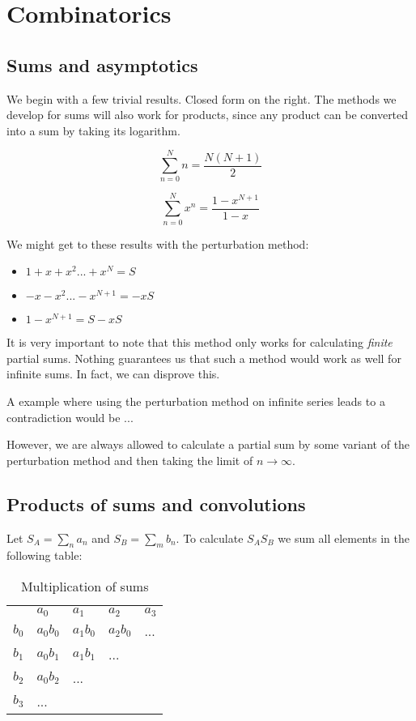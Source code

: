 \section{Combinatorics}

\subsection{Sums and asymptotics}

We begin with a few trivial results. Closed form on the right. The methods we develop for sums will also work for products, since any product can be converted into a sum by taking its logarithm.

$$ \sum_{n=0}^N n = \frac{N(N+1)}{2} $$

$$ \sum_{n=0}^N x^n = \frac{1-x^{N+1}}{1-x} $$

We might get to these results with the perturbation method:

\begin{itemize}
    \item $ 1 + x + x^2 ... + x^N = S $
    \item $ -x -x^2 ... -x^{N+1} = -xS $
    \item $ 1 - x^{N+1} = S -xS $
\end{itemize}

It is very important to note that this method only works for calculating \textit{finite} partial sums. Nothing guarantees us that such a method would work as well for infinite sums. In fact, we can disprove this.

\begin{theorem}
    A example where using the perturbation method on infinite series leads to a contradiction would be ...
\end{theorem}


However, we are always allowed to calculate a partial sum by some variant of the perturbation method and then taking the limit of $n \to \infty$.

\subsection{Products of sums and convolutions}

Let $S_A = \sum_n a_n$ and $S_B = \sum_m b_n$. To calculate $S_A S_B$ we sum all elements in the following table: 

\begin{table}[H]
\centering
\caption{Multiplication of sums}
\begin{tabular}{lllll}
     & $a_0$      & $a_1$      & $a_2$      & $a_3$ \\
$b_0$ & $a_0 b_0$ & $a_1 b_0$ & $a_2 b_0$ & ...  \\
$b_1$ & $a_0 b_1$ & $a_1 b_1$ & ...       &      \\
$b_2$ & $a_0 b_2$ & ...       &           &      \\
$b_3$ & ...       &           &           &     
\end{tabular}
\end{table}

